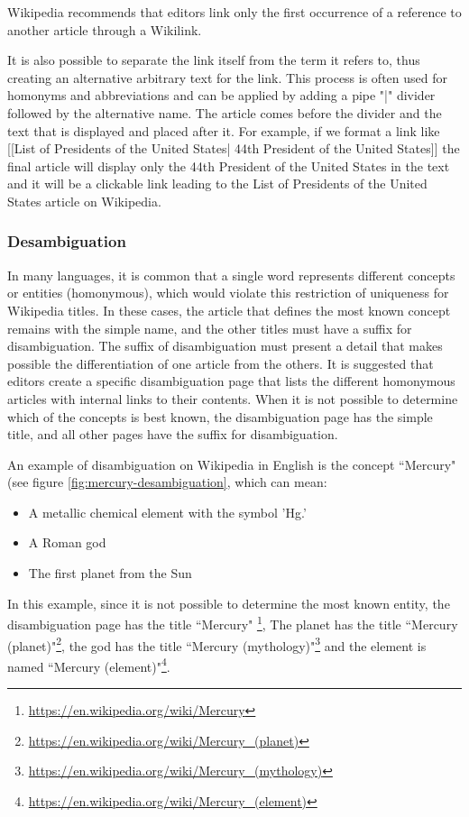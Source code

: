 Wikipedia recommends that editors link only the first occurrence of a reference to another article through a Wikilink. 

It is also possible to separate the link itself from the term it refers to, thus creating an alternative arbitrary text for the link. This process is often used for homonyms and abbreviations and can be applied by adding a pipe "|" divider followed by the alternative name. The article comes before the divider and the text that is displayed and placed after it.  For example, if we format a link like [[List of Presidents of the United States| 44th President of the United States]] the final article will display only the 44th President of the United States in the text and it will be a clickable link leading to the List of Presidents of the United States article on Wikipedia. 

\subsubsection{\hspace*{3pt}Desambiguation}

In many languages, it is common that a single word represents different concepts or entities (homonymous), which would violate this restriction of uniqueness for Wikipedia titles. In these cases, the article that defines the most known concept remains with the simple name, and the other titles must have a suffix for disambiguation. The suffix of disambiguation must present a detail that makes possible the differentiation of one article from the others. It is suggested that editors create a specific disambiguation page that lists the different homonymous articles with internal links to their contents. When it is not possible to determine which of the concepts is best known, the disambiguation page has the simple title, and all other pages have the suffix for disambiguation.


An example of disambiguation on Wikipedia in English is the concept ``Mercury" (see figure \ref{fig:mercury-desambiguation}, which can mean:

 \begin {itemize}
 \item A metallic chemical element with the symbol 'Hg.'
 \item A Roman god
 \item The first planet from the Sun
 \end {itemize}


 In this example, since it is not possible to determine the most known entity,  the disambiguation page has the title ``Mercury" \footnote{\url{https://en.wikipedia.org/wiki/Mercury}}, The planet has the title ``Mercury (planet)"\footnote{\url{https://en.wikipedia.org/wiki/Mercury_(planet)}}, the god has the title ``Mercury (mythology)"\footnote{\url{https://en.wikipedia.org/wiki/Mercury_(mythology)}} and the element is named ``Mercury (element)"\footnote{\url{https://en.wikipedia.org/wiki/Mercury_(element)}}.

